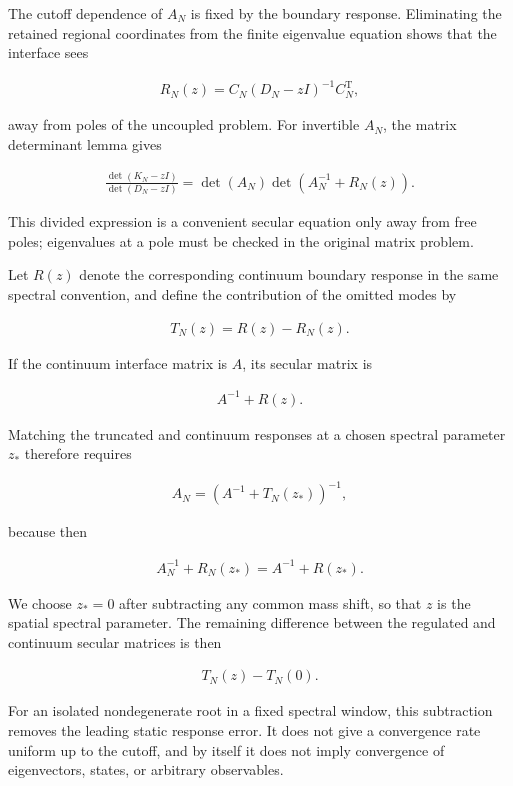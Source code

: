 The cutoff dependence of $A_N$ is fixed by the boundary response. Eliminating the retained regional coordinates from the finite eigenvalue equation shows that the interface sees

\begin{align}
R_N(z)
=C_N(D_N-zI)^{-1}C_N^{\mathrm T},
\end{align}

away from poles of the uncoupled problem. For invertible $A_N$, the matrix determinant lemma gives

\begin{align}
\frac{\det(K_N-zI)}{\det(D_N-zI)}
=\det(A_N)\det\left(A_N^{-1}+R_N(z)\right).
\end{align}

This divided expression is a convenient secular equation only away from free poles; eigenvalues at a pole must be checked in the original matrix problem.

Let $R(z)$ denote the corresponding continuum boundary response in the same spectral convention, and define the contribution of the omitted modes by

\begin{align}
T_N(z)=R(z)-R_N(z).
\end{align}

If the continuum interface matrix is $A$, its secular matrix is

\begin{align}
A^{-1}+R(z).
\end{align}

Matching the truncated and continuum responses at a chosen spectral parameter $z_*$ therefore requires

\begin{align}
A_N
=\left(A^{-1}+T_N(z_*)\right)^{-1},
\end{align}

because then

\begin{align}
A_N^{-1}+R_N(z_*)
=A^{-1}+R(z_*).
\end{align}

We choose $z_*=0$ after subtracting any common mass shift, so that $z$ is the spatial spectral parameter. The remaining difference between the regulated and continuum secular matrices is then

\begin{align}
T_N(z)-T_N(0).
\end{align}

For an isolated nondegenerate root in a fixed spectral window, this subtraction removes the leading static response error. It does not give a convergence rate uniform up to the cutoff, and by itself it does not imply convergence of eigenvectors, states, or arbitrary observables.

